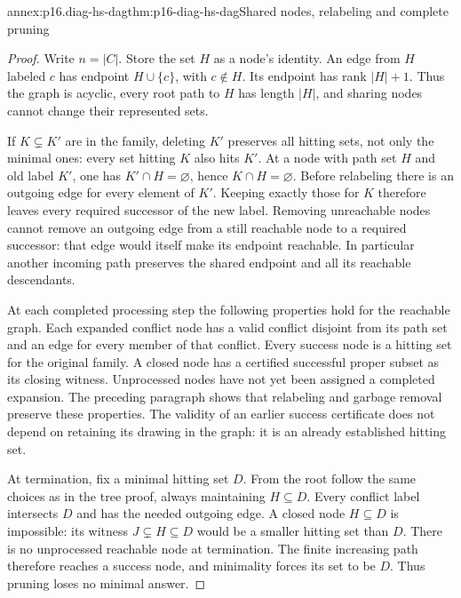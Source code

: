 \begin{annexitem}{annex:p16.diag-hs-dag}{thm:p16-diag-hs-dag}{Shared nodes, relabeling and complete pruning}
\begin{proof}
Write \(n=|C|\). Store the set \(H\) as a node's identity.
An edge from \(H\) labeled \(c\) has endpoint
\(H\cup\{c\}\), with \(c\notin H\). Its endpoint
has rank \(|H|+1\). Thus the graph is acyclic, every
root path to \(H\) has length \(|H|\), and sharing
nodes cannot change their represented sets.

If \(K\subsetneq K'\) are in the family, deleting
\(K'\) preserves all hitting sets, not only the minimal
ones: every set hitting \(K\) also hits \(K'\).
At a node with path set \(H\) and old label \(K'\),
one has \(K'\cap H=\varnothing\), hence
\(K\cap H=\varnothing\). Before relabeling there is
an outgoing edge for every element of \(K'\).
Keeping exactly those for \(K\) therefore leaves
every required successor of the new label.
Removing unreachable nodes cannot remove an outgoing
edge from a still reachable node to a required successor:
that edge would itself make its endpoint reachable.
In particular another incoming path preserves the
shared endpoint and all its reachable descendants.

At each completed processing step the following properties
hold for the reachable graph. Each expanded conflict node
has a valid conflict disjoint from its path set and an
edge for every member of that conflict. Every success
node is a hitting set for the original family. A closed
node has a certified successful proper subset as its
closing witness. Unprocessed nodes have not yet been
assigned a completed expansion. The preceding paragraph
shows that relabeling and garbage removal preserve these
properties. The validity of an earlier success certificate
does not depend on retaining its drawing in the graph:
it is an already established hitting set.

At termination, fix a minimal hitting set \(D\).
From the root follow the same choices as in the tree
proof, always maintaining \(H\subseteq D\).
Every conflict label intersects \(D\) and has the needed
outgoing edge. A closed node \(H\subseteq D\) is
impossible: its witness \(J\subsetneq H\subseteq D\)
would be a smaller hitting set than \(D\).
There is no unprocessed reachable node at termination.
The finite increasing path therefore reaches a success
node, and minimality forces its set to be \(D\).
Thus pruning loses no minimal answer.


\end{proof}
\end{annexitem}
